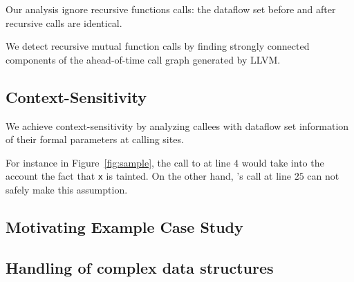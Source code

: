 Our analysis ignore recursive functions calls: the dataflow set
before and after recursive calls are identical. 

We detect recursive mutual function calls by finding strongly
connected components of the ahead-of-time call graph generated
by LLVM. 

\subsection{Context-Sensitivity} 

We achieve context-sensitivity by analyzing callees
with dataflow set information of their formal parameters
at calling sites.

For instance in Figure~\ref{fig:sample}, the call to \even{} at
line $4$ would take into the account the fact that \texttt{x}
is tainted.
On the other hand, \even{}'s call at line $25$ can not safely
make this assumption.

\subsection{Motivating Example Case Study}\label{sec:sampleSummary}

\subsection{Handling of complex data structures}
